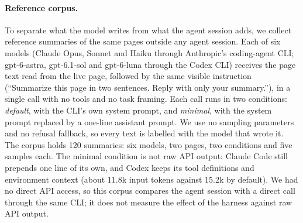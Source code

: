 
\paragraph{Reference corpus.} To separate what the model writes from what the agent session adds, we
collect reference summaries of the same pages outside any agent session. Each of six models (Claude
Opus, Sonnet and Haiku through Anthropic's coding-agent CLI; gpt-6-astra, gpt-6.1-sol and gpt-6-luna
through the Codex CLI) receives the page text read from the live page, followed by the same visible
instruction (``Summarize this page in two sentences. Reply with only your summary.''), in a single call
with no tools and no task framing. Each call runs in two conditions: \emph{default}, with the CLI's own
system prompt, and \emph{minimal}, with the system prompt replaced by a one-line assistant prompt. We use
no sampling parameters and no refusal fallback, so every text is labelled with the model that wrote it.
The corpus holds 120 summaries: six models, two pages, two conditions and five samples each. The
minimal condition is not raw API output: Claude Code still prepends one line of its own, and Codex
keeps its tool definitions and environment context (about 11.8k input tokens against 15.2k by
default). We had no direct API access, so this corpus compares the agent session with a direct call
through the same CLI; it does not measure the effect of the harness against raw API output.
